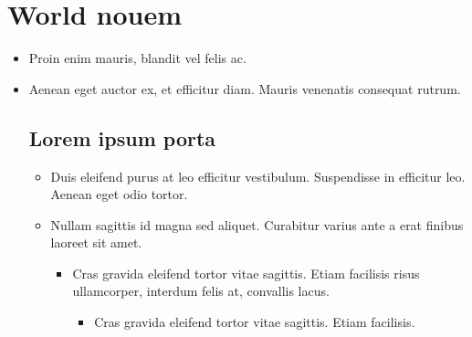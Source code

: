 \documentclass[header]{nosvagor-notes}
\begin{document}
\section{World nouem}
\begin{itemize}
  \item Proin enim mauris, blandit vel felis ac.

  \item Aenean eget auctor ex, et efficitur diam. Mauris venenatis consequat rutrum.

  \subsection{Lorem ipsum porta}
  \begin{itemize}
    \item Duis eleifend purus at leo efficitur vestibulum. Suspendisse in
      efficitur leo. Aenean eget odio tortor.

    \item Nullam sagittis id magna sed aliquet. Curabitur varius ante a erat
      finibus laoreet sit amet.
      \begin{itemize}
        \item Cras gravida eleifend tortor vitae sagittis. Etiam facilisis
          risus ullamcorper, interdum felis at, convallis lacus.
          \begin{itemize}
            \item Cras gravida eleifend tortor vitae sagittis. Etiam facilisis.

          \end{itemize}
      \end{itemize}
  \end{itemize}

\end{itemize}
\end{document}

